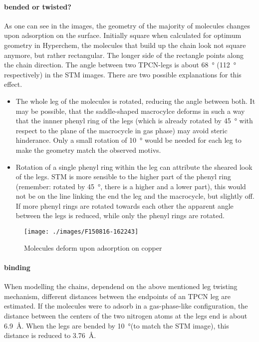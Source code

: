\paragraph{bended or twisted?}
As one can see in the images, the geometry of the majority of molecules changes upon adsorption on the surface.
Initially square when calculated for optimum geometry in Hyperchem, the molecules that build up the chain look not square anymore, but rather rectangular. The longer side of the rectangle points along the chain direction.
The angle between two TPCN-legs is about \SI{68}{\degree} (\SI{112}{\degree} respectively) in the STM images. There are two possible explanations for this effect.
\begin{itemize}
 \item The whole leg of the molecules is rotated, reducing the angle between both. It may be possible, that the saddle-shaped macrocylce deforms in such a way that the innner phenyl ring of the legs (which is already rotated by \SI{45}{\degree} with respect to the plane of the macrocycle in gas phase) may avoid steric hinderance. Only a small rotation of \SI{10}{\degree} would be needed for each leg to make the geometry match the observed motivs.
 \item Rotation of a single phenyl ring within the leg can attribute the sheared look of the legs. STM is more sensible to the higher part of the phenyl ring (remember: rotated by \SI{45}{\degree}, there is a higher and a lower part), this would not be on the line linking the end the leg and the macrocycle, but slightly off. If more phenyl rings are rotated towards each other the apparent angle between the legs is reduced, while only the phenyl rings are rotated. 
\end{itemize}

\begin{figure}
 \centering
 \texttt{[image: ./images/F150816-162243]}
 \caption{Molecules deform upon adsorption on copper}
\end{figure}

\paragraph{binding}
\label{chapter:TPCN-adatoms}
When modelling the chains, dependend on the above mentioned leg twisting mechanism, different distances between the endpoints of an TPCN leg are estimated. If the molecules were to adsorb in a gas-phase-like configuration, the distance between the centers of the two nitrogen atoms at the legs end is about \SI{6.9}{\angstrom}. When the legs are bended by \SI{10}{\degree}(to match the STM image), this distance is reduced to \SI{3.76}{\angstrom}.

